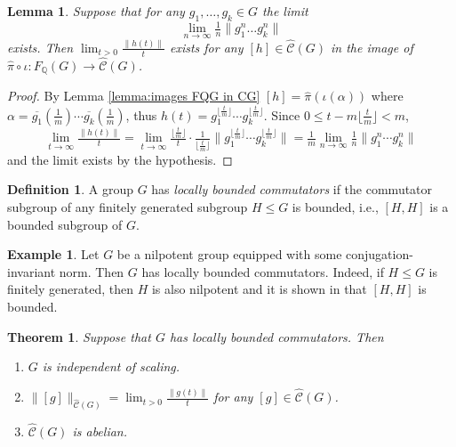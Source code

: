 \documentclass[12pt]{amsart}
\newtheorem{theorem}[prop]{Theorem}
\newtheorem{lemma}[prop]{Lemma}
\theoremstyle{definition}
\newtheorem{defn}[prop]{Definition}
\newtheorem{example}[prop]{Example}
\def\QQ{\ensuremath{\mathbb{Q}}}
\def\Free{F}
\def\tC{\hat{\mathcal{C}}}
\newcommand{\Myfloor}[1]{\lfloor #1 \rfloor}
\newcommand{\myfloor}[1]{\llfloor #1 \rrfloor}
\begin{document}
\begin{lemma}\label{lem:multivariate powers of elements}
Suppose that for any $g_1,\dots,g_k \in G$ the limit
\[
\lim_{n \to \infty} \tfrac{1}{n} \|g_1^n \dots g_k^n\|
\] 
exists.
Then $\lim_{t >0} \tfrac{\|h(t)\|}{t}$ exists for any $[h] \in \tC(G)$ in the image of $\hat{\pi} \circ \iota \colon \Free_\QQ(G) \to \tC(G)$.
\end{lemma}


\begin{proof}
By Lemma \ref{lemma:images FQG in CG} $[h]=\hat{\pi}(\iota(\alpha))$ where $\alpha=\overline{g_1}(\tfrac{1}{m}) \cdots \overline{g_k}(\tfrac{1}{m})$, thus $h(t)=g_1^{\Myfloor{\tfrac{t}{m}}} \cdots g_k^{\Myfloor{\tfrac{t}{m}}}$.
Since $0 \leq t-m\Myfloor{\tfrac{t}{m}} < m$, %
\[
\lim_{t\to \infty} \tfrac{\| h(t)\| }{t} =
\lim_{t\to \infty} \tfrac{\Myfloor{\tfrac{t}{m}}}{t} \cdot  \tfrac{1}{\Myfloor{\tfrac{t}{m}}} \| g_1^{\Myfloor{\tfrac{t}{m}}} \cdots g_k^{\Myfloor{\tfrac{t}{m}}} \| =
\tfrac{1}{m} \lim_{n \to \infty} \tfrac{1}{n} \| g_1^n \cdots g_k^n\|
\]
and the limit exists by the hypothesis.
\end{proof}





\begin{defn}\label{def:locally bounded commutators}
A group $G$ has {\em locally bounded commutators} if the commutator subgroup of any finitely generated subgroup $H \leq G$ is bounded, i.e., $[H,H]$ is a bounded subgroup of $G$.
\end{defn}






\begin{example}\label{example:nilpotent loc bdd comm}
Let $G$ be a nilpotent group equipped with some conjugation-invariant norm. %
Then $G$ has locally bounded commutators.
Indeed, if $H \leq G$ is finitely generated, then $H$ is also nilpotent and it is shown in \cite[Theorem 5.H]{MR3426433} that $[H,H]$ is bounded. 
\end{example}





\begin{theorem}\label{T:abelian independent of scaling}
Suppose that $G$ has locally bounded commutators.
Then 
\begin{enumerate}[label=(\alph*)]
\item\label{item:T loc com:indep scaling}  
$G$ is independent of scaling.
\item\label{item:T loc com:limit}
 $\| [g]\|_{\tC(G)}=\lim_{t>0} \tfrac{\|g(t)\|}{t}$ for any $[g] \in \tC(G)$. 
\item\label{item:T loc com:abelian}
$\tC(G)$ is abelian.
\end{enumerate}
\end{theorem}
\end{document}
